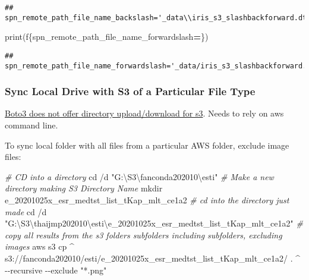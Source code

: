 \documentclass[
]{book}
\newenvironment{Shaded}{\begin{snugshade}}{\end{snugshade}}
\newcommand{\BuiltInTok}[1]{#1}
\newcommand{\CommentTok}[1]{\textcolor[rgb]{0.56,0.35,0.01}{\textit{#1}}}
\newcommand{\ExtensionTok}[1]{#1}
\newcommand{\FunctionTok}[1]{\textcolor[rgb]{0.00,0.00,0.00}{#1}}
\newcommand{\NormalTok}[1]{#1}
\newcommand{\OperatorTok}[1]{\textcolor[rgb]{0.81,0.36,0.00}{\textbf{#1}}}
\newcommand{\SpecialCharTok}[1]{\textcolor[rgb]{0.00,0.00,0.00}{#1}}
\newcommand{\SpecialStringTok}[1]{\textcolor[rgb]{0.31,0.60,0.02}{#1}}
\newcommand{\StringTok}[1]{\textcolor[rgb]{0.31,0.60,0.02}{#1}}
\begin{document}
\begin{verbatim}
## spn_remote_path_file_name_backslash='_data\\iris_s3_slashbackforward.dta'
\end{verbatim}

\begin{Shaded}
\begin{Highlighting}[]
\BuiltInTok{print}\NormalTok{(}\SpecialStringTok{f\textquotesingle{}}\SpecialCharTok{\{}\NormalTok{spn\_remote\_path\_file\_name\_forwardslash}\OperatorTok{=}\SpecialCharTok{\}}\SpecialStringTok{\textquotesingle{}}\NormalTok{)}
\end{Highlighting}
\end{Shaded}

\begin{verbatim}
## spn_remote_path_file_name_forwardslash='_data/iris_s3_slashbackforward.dta'
\end{verbatim}

\hypertarget{sync-local-drive-with-s3-of-a-particular-file-type}{%
\subsubsection{Sync Local Drive with S3 of a Particular File Type}\label{sync-local-drive-with-s3-of-a-particular-file-type}}

\href{https://github.com/boto/boto3/issues/358}{Boto3 does not offer directory upload/download for s3}. Needs to rely on aws command line.

To sync local folder with all files from a particular AWS folder, exclude image files:

\begin{Shaded}
\begin{Highlighting}[]
\CommentTok{\# CD into a directory}
\BuiltInTok{cd}\NormalTok{ /d }\StringTok{"G:\textbackslash{}S3\textbackslash{}fanconda202010\textbackslash{}esti"}
\CommentTok{\# Make a new directory making S3 Directory Name}
\FunctionTok{mkdir}\NormalTok{ e\_20201025x\_esr\_medtst\_list\_tKap\_mlt\_ce1a2}
\CommentTok{\# cd into the directory just made}
\BuiltInTok{cd}\NormalTok{ /d }\StringTok{"G:\textbackslash{}S3\textbackslash{}thaijmp202010\textbackslash{}esti\textbackslash{}e\_20201025x\_esr\_medtst\_list\_tKap\_mlt\_ce1a2"}
\CommentTok{\# copy all results from the s3 folder\textquotesingle{}s subfolders including subfolders, excluding images}
\ExtensionTok{aws}\NormalTok{ s3 cp \^{}}
    \ExtensionTok{s3}\NormalTok{://fanconda202010/esti/e\_20201025x\_esr\_medtst\_list\_tKap\_mlt\_ce1a2/ . \^{}}
    \ExtensionTok{{-}{-}recursive}\NormalTok{ {-}{-}exclude }\StringTok{"*.png"}
\end{Highlighting}
\end{Shaded}
\end{document}
